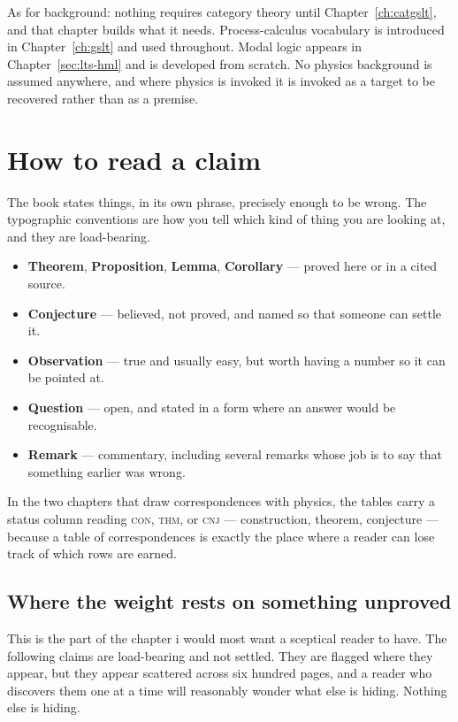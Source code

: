 As for background: nothing requires category theory until
Chapter~\ref{ch:catgslt}, and that chapter builds what it needs.
Process-calculus vocabulary is introduced in
Chapter~\ref{ch:gslt} and used throughout.
Modal logic appears in Chapter~\ref{sec:lts-hml} and is developed
from scratch.
No physics background is assumed anywhere, and where physics is
invoked it is invoked as a target to be recovered rather than as a
premise.

\section*{How to read a claim}

The book states things, in its own phrase, precisely enough to be
wrong.
The typographic conventions are how you tell which kind of thing
you are looking at, and they are load-bearing.

\begin{itemize}[leftmargin=1.6em, itemsep=3pt]
\item \textbf{Theorem}, \textbf{Proposition}, \textbf{Lemma},
      \textbf{Corollary} --- proved here or in a cited source.
\item \textbf{Conjecture} --- believed, not proved, and named so
      that someone can settle it.
\item \textbf{Observation} --- true and usually easy, but worth
      having a number so it can be pointed at.
\item \textbf{Question} --- open, and stated in a form where an
      answer would be recognisable.
\item \textbf{Remark} --- commentary, including several remarks
      whose job is to say that something earlier was wrong.
\end{itemize}

\noindent
In the two chapters that draw correspondences with physics, the
tables carry a status column reading \textsc{con}, \textsc{thm}, or
\textsc{cnj} --- construction, theorem, conjecture --- because a
table of correspondences is exactly the place where a reader can
lose track of which rows are earned.

\subsection*{Where the weight rests on something unproved}

This is the part of the chapter i would most want a sceptical
reader to have.
The following claims are load-bearing and not settled.
They are flagged where they appear, but they appear scattered
across six hundred pages, and a reader who discovers them one at a
time will reasonably wonder what else is hiding.
Nothing else is hiding.

